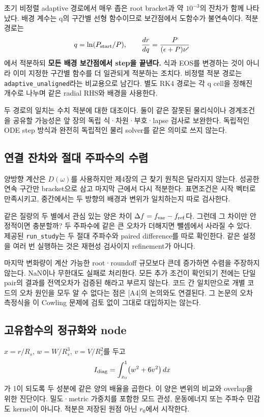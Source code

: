 \documentclass[
  10pt,
  a4paper,
]{article}
\begin{document}
초기 비정렬 adaptive 경로에서 매우 좁은 root bracket과 약 \(10^{-3}\)의
잔차가 함께 나타났다. 배경 계수는 q의 구간별 선형 함수이므로 보간점에서
도함수가 불연속이다. 적분 경로는 \[
q=\ln(P_{\rm start}/P),\qquad \frac{dr}{dq}=\frac{P}{(\epsilon+P)\nu'}
\] 에서 적분하되 \textbf{모든 배경 보간점에서 step을 끝낸다.} 식과 EOS를
변경하는 것이 아니라 이미 지정한 구간별 함수를 더 일관되게 적분하는
조치다. 비정렬 적분 경로는 \texttt{adaptive\_unaligned}라는 비교용으로
남긴다. 별도 RK4 경로는 각 q cell을 정해진 개수로 나누며 같은 radial
RHS와 배경을 사용한다.

두 경로의 일치는 수치 적분에 대한 대조이다. 둘이 같은 잘못된 물리식이나
경계조건을 공유할 가능성은 앞 장의 독립 식·차원·부호·lapse 검사로
보완한다. 독립적인 ODE step 방식과 완전히 독립적인 물리 solver를 같은
의미로 쓰지 않는다.

\subsection{연결 잔차와 절대 주파수의
수렴}\label{uxc5f0uxacb0-uxc794uxcc28uxc640-uxc808uxb300-uxc8fcuxd30cuxc218uxc758-uxc218uxb834}

양방향 계산은 \(D(\omega)\)를 사용하지만 제4장의 근 찾기 원칙은 달라지지
않는다. 성공한 연속 구간만 bracket으로 삼고 마지막 근에서 다시 적분한다.
표면조건은 시작 벡터로 만족시키고, 중간에서는 두 방향의 배경과 변위가
일치하는지 따로 검사한다.

같은 질량의 두 별에서 관심 있는 양은 차이
\(\Delta f=f_{\rm var}-f_{\rm ref}\)다. 그런데 그 차이만 안정적이면
충분할까? 두 주파수에 같은 큰 오차가 더해지면 뺄셈에서 사라질 수 있다.
제공된 \texttt{run\_study}는 두 절대 주파수와 paired difference를 따로
확인한다. 같은 설정을 여러 번 실행하는 것은 재현성 검사이지 refinement가
아니다.

마지막 변화량이 계산 가능한 root·roundoff 규모보다 큰데 증가하면 수렴을
주장하지 않는다. NaN이나 무한대도 실패로 처리한다. 모든 추가 조건이
확인되기 전에는 단일 pair의 결과를 전역오차가 검증된 해라고 부르지
않는다. 코드 간 일치만으로 개별 코드의 오차 원인을 모두 알 수 없다는
점은 {[}A4{]}의 논의와도 연결된다. 그 논문의 오차 측정식을 이 Cowling
문제에 검토 없이 그대로 대입하지는 않는다.

\subsection{고유함수의 정규화와
node}\label{uxace0uxc720uxd568uxc218uxc758-uxc815uxaddcuxd654uxc640-node}

\(x=r/R_s\), \(w=W/R_s^3\), \(v=V/R_s^2\)를 두고 \[
I_{\rm diag}=\int_{x_0}^{1}\bigl(w^2+6v^2\bigr)\,dx
\] 가 1이 되도록 두 성분에 같은 양의 배율을 곱한다. 이 양은 변위의
비교와 overlap을 위한 진단이다. 밀도·metric 가중치를 포함한 모드 관성,
운동에너지 또는 주파수 민감도 kernel이 아니다. 적분은 저장된 원점 아닌
\(r_0\)에서 시작한다.
\end{document}
